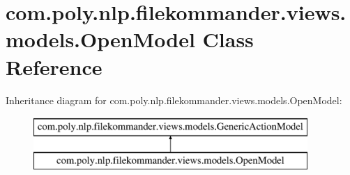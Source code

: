 \hypertarget{classcom_1_1poly_1_1nlp_1_1filekommander_1_1views_1_1models_1_1_open_model}{\section{com.\-poly.\-nlp.\-filekommander.\-views.\-models.\-Open\-Model Class Reference}
\label{classcom_1_1poly_1_1nlp_1_1filekommander_1_1views_1_1models_1_1_open_model}
}
Inheritance diagram for com.\-poly.\-nlp.\-filekommander.\-views.\-models.\-Open\-Model\-:\begin{figure}[H]
\begin{center}
\leavevmode
\includegraphics[height=2.000000cm]{classcom_1_1poly_1_1nlp_1_1filekommander_1_1views_1_1models_1_1_open_model}
\end{center}
\end{figure}
